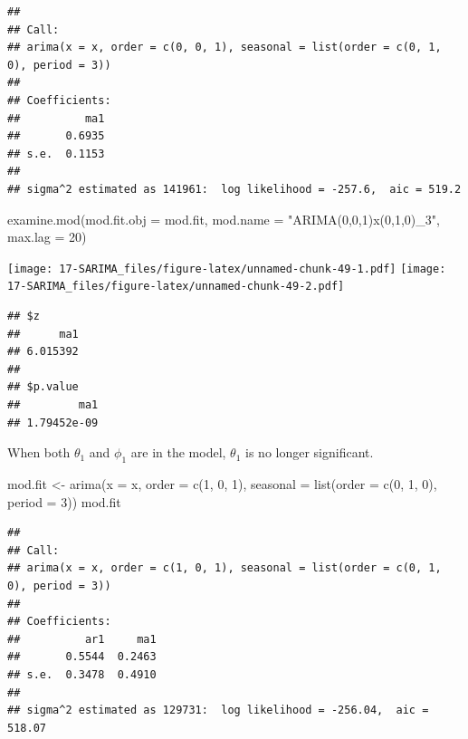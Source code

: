 \documentclass[
]{book}
\newenvironment{Shaded}{\begin{snugshade}}{\end{snugshade}}
\newcommand{\AttributeTok}[1]{\textcolor[rgb]{0.77,0.63,0.00}{#1}}
\newcommand{\DecValTok}[1]{\textcolor[rgb]{0.00,0.00,0.81}{#1}}
\newcommand{\FunctionTok}[1]{\textcolor[rgb]{0.00,0.00,0.00}{#1}}
\newcommand{\NormalTok}[1]{#1}
\newcommand{\OtherTok}[1]{\textcolor[rgb]{0.56,0.35,0.01}{#1}}
\newcommand{\StringTok}[1]{\textcolor[rgb]{0.31,0.60,0.02}{#1}}
\theoremstyle{definition}
\theoremstyle{definition}
\theoremstyle{definition}
\theoremstyle{definition}
\theoremstyle{remark}
\begin{document}
\begin{verbatim}
## 
## Call:
## arima(x = x, order = c(0, 0, 1), seasonal = list(order = c(0, 1, 0), period = 3))
## 
## Coefficients:
##          ma1
##       0.6935
## s.e.  0.1153
## 
## sigma^2 estimated as 141961:  log likelihood = -257.6,  aic = 519.2
\end{verbatim}

\begin{Shaded}
\begin{Highlighting}[]
  \FunctionTok{examine.mod}\NormalTok{(}\AttributeTok{mod.fit.obj =}\NormalTok{ mod.fit, }\AttributeTok{mod.name =} \StringTok{"ARIMA(0,0,1)x(0,1,0)\_3"}\NormalTok{, }\AttributeTok{max.lag =} \DecValTok{20}\NormalTok{)}
\end{Highlighting}
\end{Shaded}

\texttt{[image: 17-SARIMA\_files/figure-latex/unnamed-chunk-49-1.pdf]} \texttt{[image: 17-SARIMA\_files/figure-latex/unnamed-chunk-49-2.pdf]}

\begin{verbatim}
## $z
##      ma1 
## 6.015392 
## 
## $p.value
##         ma1 
## 1.79452e-09
\end{verbatim}

When both \(\theta_1\) and \(\phi_1\) are in the model, \(\theta_1\) is no longer significant.

\begin{Shaded}
\begin{Highlighting}[]
\NormalTok{  mod.fit }\OtherTok{\textless{}{-}} \FunctionTok{arima}\NormalTok{(}\AttributeTok{x =}\NormalTok{ x, }\AttributeTok{order =} \FunctionTok{c}\NormalTok{(}\DecValTok{1}\NormalTok{, }\DecValTok{0}\NormalTok{, }\DecValTok{1}\NormalTok{), }\AttributeTok{seasonal =} \FunctionTok{list}\NormalTok{(}\AttributeTok{order =} \FunctionTok{c}\NormalTok{(}\DecValTok{0}\NormalTok{, }\DecValTok{1}\NormalTok{, }\DecValTok{0}\NormalTok{), }\AttributeTok{period =} \DecValTok{3}\NormalTok{))}
\NormalTok{  mod.fit}
\end{Highlighting}
\end{Shaded}

\begin{verbatim}
## 
## Call:
## arima(x = x, order = c(1, 0, 1), seasonal = list(order = c(0, 1, 0), period = 3))
## 
## Coefficients:
##          ar1     ma1
##       0.5544  0.2463
## s.e.  0.3478  0.4910
## 
## sigma^2 estimated as 129731:  log likelihood = -256.04,  aic = 518.07
\end{verbatim}
\end{document}

